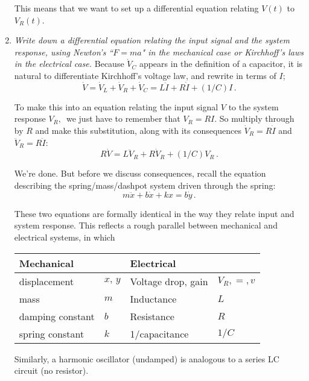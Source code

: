 \begin{enumerate}
  This means that we want to set up a differential equation relating $V(t)$ to $V _R (t)$.

\item \emph{\color{blue}Write down a differential equation relating the input signal and the system response,
    using Newton's ``$F=ma$" in the mechanical case or Kirchhoff's laws in the electrical case.}
  Because $\dot V _C$ appears in the definition of a capacitor,
  it is natural to differentiate Kirchhoff's voltage law, and rewrite in terms of $I$;
  \begin{equation*}
    \dot V=\dot V_ L+\dot V_ R+\dot V_ C=L\ddot I+R\dot I+(1/C)I\, .
  \end{equation*}

  To make this into an equation relating the input signal $V$ to the system response $V _R, \,$
  we just have to remember that $V _R=RI$. So multiply through by $R$ and make this substitution,
  along with its consequences $\dot V _R=R \dot I$ and $\ddot V _R= R \ddot I$:
  \begin{equation*}
    R\dot V=L\ddot V_ R+R\dot V_ R+(1/C)V_ R\, .
  \end{equation*}

  We're done. But before we discuss consequences, recall the equation describing
  the spring/mass/dashpot system driven through the spring:
  \begin{equation*}
    m\ddot x+b\dot x+kx=b\dot y\, .
  \end{equation*}

  \clearpage
  
  These two equations are formally identical in the way they relate input and system response.
  This reflects a rough parallel between mechanical and electrical systems, in which

  \begin{table}[ht!]
    \centering
    \begin{tabular}{|l|l|l|l|}
      \hline
      \multicolumn{2}{|l|}{Mechanical} & \multicolumn{2}{l|}{Electrical} \\ \hline
      displacement & $x,\, y$ & Voltage drop, gain& $V _R,=, v$\\ \hline
      mass & $m$ & Inductance & $L$ \\ \hline
      damping constant & $b$ & Resistance& $R$ \\ \hline
      spring constant  & $k$ & 1/capacitance & $1/C$ \\ \hline
    \end{tabular}
  \end{table}
  Similarly, a harmonic oscillator (undamped) is analogous to a series LC circuit (no resistor).
\end{enumerate}

